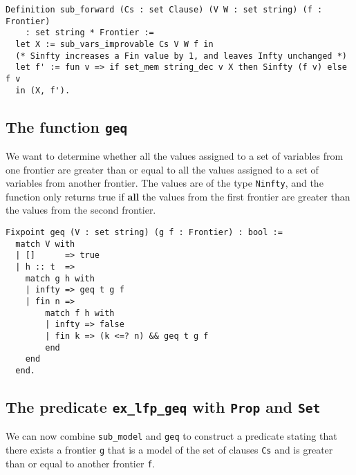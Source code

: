 \begin{minipage}{\linewidth}
\begin{lstlisting}[language=Coq, label={lst:sub_forward_def}, caption={The function \lstinline{sub_forward} in Coq}]
Definition sub_forward (Cs : set Clause) (V W : set string) (f : Frontier)
    : set string * Frontier :=
  let X := sub_vars_improvable Cs V W f in
  (* Sinfty increases a Fin value by 1, and leaves Infty unchanged *)
  let f' := fun v => if set_mem string_dec v X then Sinfty (f v) else f v
  in (X, f').
\end{lstlisting}
\end{minipage}

\subsection{The function \lstinline{geq}}

We want to determine whether all the values assigned to a set of variables
from one frontier are greater than or equal to all the values assigned to a set of variables
from another frontier. The values are of the type \lstinline{Ninfty}, and the function
only returns true if \textbf{all} the values from the first frontier are greater than
the values from the second frontier.

\begin{minipage}{\linewidth}
\begin{lstlisting}[language=Coq, label={lst:geq_def}, caption={Point-wise comparing frontiers with \lstinline{geq} in Coq}]
Fixpoint geq (V : set string) (g f : Frontier) : bool :=
  match V with
  | []      => true
  | h :: t  =>
    match g h with
    | infty => geq t g f
    | fin n =>
        match f h with
        | infty => false
        | fin k => (k <=? n) && geq t g f
        end
    end
  end.
\end{lstlisting}
\end{minipage}

\subsection{The predicate \lstinline{ex_lfp_geq} with \lstinline{Prop} and \lstinline{Set}}
\label{ssec:ex_lfp_geq}

We can now combine \lstinline{sub_model} and \lstinline{geq} to construct a predicate
stating that there exists a frontier \lstinline{g} that is a model of the set of clauses \lstinline{Cs}
and is greater than or equal to another frontier \lstinline{f}.

